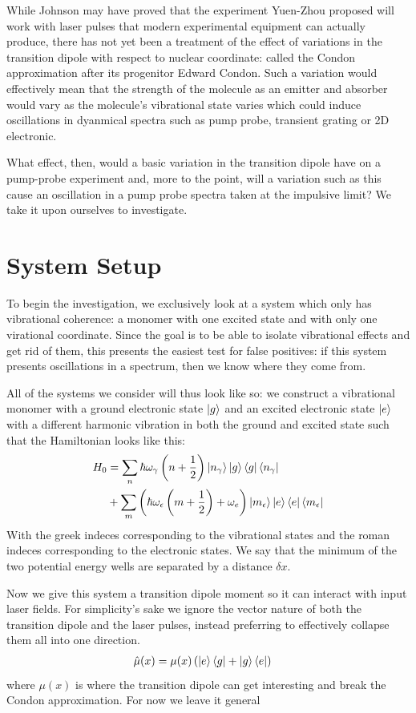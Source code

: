 While Johnson may have proved that the experiment Yuen-Zhou proposed will work with laser pulses that modern experimental equipment can actually produce, there has not yet been a treatment of the effect of variations in the transition dipole with respect to nuclear coordinate: called the Condon approximation after its progenitor Edward Condon\cite{Condon}.  Such a variation would effectively mean that the strength of the molecule as an emitter and absorber would vary as the molecule's vibrational state varies which could induce oscillations in dyanmical spectra such as pump probe, transient grating or 2D electronic.

What effect, then, would a basic variation in the transition dipole have on a pump-probe experiment and, more to the point, will a variation such as this cause an oscillation in a pump probe spectra taken at the impulsive limit?  We take it upon ourselves to investigate.

\section{System Setup}
To begin the investigation, we exclusively look at a system which only has vibrational coherence: a monomer with one excited state and with only one virational coordinate.   Since the goal is to be able to isolate vibrational effects and get rid of them, this presents the easiest test for false positives: if this system presents oscillations in a spectrum, then we know where they come from.

All of the systems we consider will thus look like so: we construct a vibrational monomer with a ground electronic state $\ket{g}$ and an excited electronic state $\ket{e}$ with a different harmonic vibration in both the ground and excited state such that the Hamiltonian looks like this:
\begin{align}
	H_0 &=  \sum_n \hbar \omega_{\gamma}  \left(n + \frac{1}{2} \right)  \ket{n_{\gamma}}\ket{g}\bra{g} \bra{n_{\gamma}} \\
   &+ \sum_m \left(  \hbar \omega_{\epsilon}  \left(m + \frac{1}{2} \right) + \omega_e \right)  \ket{m_{\epsilon}} \ket{e}\bra{e} \bra{m_{\epsilon}}
\end{align}
With the greek indeces corresponding to the vibrational states and the roman indeces corresponding to the electronic states.  We say that the minimum of the two potential energy wells are separated by a distance $\delta x$.

Now we give this system a transition dipole moment so it can interact with input laser fields.  For simplicity's sake we ignore the vector nature of both the transition dipole and the laser pulses, instead preferring to effectively collapse them all into one direction.
\begin{align}
	\hat{\mu}(x) &= \mu (x)  \left( \ket{e}\bra{g} + \ket{g} \bra{e} \right)
\end{align}
where $\mu (x)$ is where the transition dipole can get interesting and break the Condon approximation.  For now we leave it general


